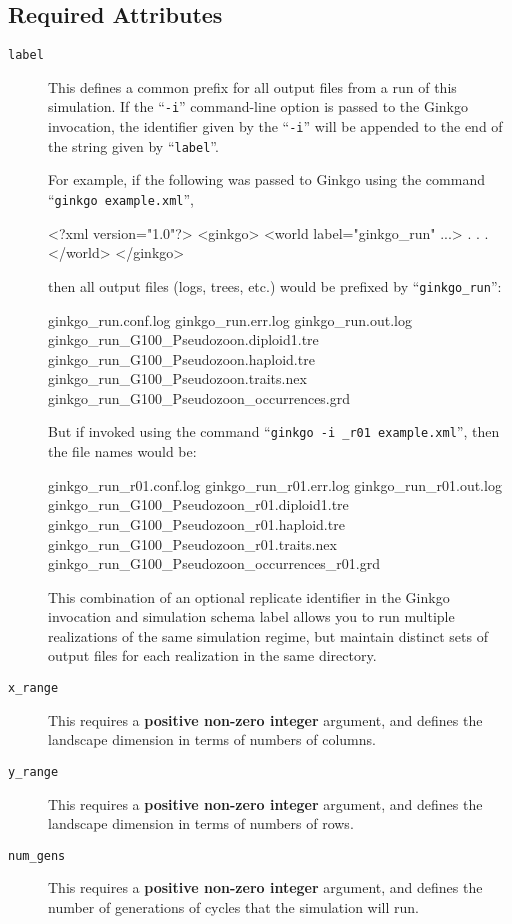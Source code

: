 \documentclass[11pt]{article}
\newcommand{\xmlattr}[1]{{\tt\textcolor{xmlattr}{#1}}}
\begin{document}
\subsection{Required Attributes}
\begin{description}

	\item[\xmlattr{label}] This defines a common prefix for all output files from a run of this simulation. If the ``\verb=-i='' command-line option is passed to the Ginkgo invocation, the identifier given by the ``\verb=-i='' will be appended to the end of the string given by ``\verb=label=''.

	For example, if the following was passed to Ginkgo using the command ``\verb=ginkgo example.xml='',

	\begin{ginkgoxml}
<?xml version="1.0"?>
<ginkgo>
    <world label="ginkgo_run" ...>
	.
	.
	.
    </world>
</ginkgo>
	\end{ginkgoxml}

then all output files (logs, trees, etc.) would be prefixed by ``\verb=ginkgo_run='':

\begin{shell}
ginkgo_run.conf.log
ginkgo_run.err.log
ginkgo_run.out.log
ginkgo_run_G100_Pseudozoon.diploid1.tre
ginkgo_run_G100_Pseudozoon.haploid.tre
ginkgo_run_G100_Pseudozoon.traits.nex
ginkgo_run_G100_Pseudozoon_occurrences.grd
\end{shell}

But if invoked using the command ``\verb=ginkgo -i _r01 example.xml='', then the file names would be:

\begin{shell}
ginkgo_run_r01.conf.log
ginkgo_run_r01.err.log
ginkgo_run_r01.out.log
ginkgo_run_G100_Pseudozoon_r01.diploid1.tre
ginkgo_run_G100_Pseudozoon_r01.haploid.tre
ginkgo_run_G100_Pseudozoon_r01.traits.nex
ginkgo_run_G100_Pseudozoon_occurrences_r01.grd
\end{shell}

This combination of an optional replicate identifier in the Ginkgo invocation and simulation schema label allows you to run multiple realizations of the same simulation regime, but maintain distinct sets of output files for each realization in the same directory.

	\item[\xmlattr{x\_range}] This requires a \textbf{positive non-zero integer} argument, and defines the landscape dimension in terms of numbers of columns.

	\item[\xmlattr{y\_range}] This requires a \textbf{positive non-zero integer} argument, and defines the landscape dimension in terms of numbers of rows.

	\item[\xmlattr{num\_gens}] This requires a \textbf{positive non-zero integer} argument, and defines the number of generations of cycles that the simulation will run.

\end{description}
\end{document}
